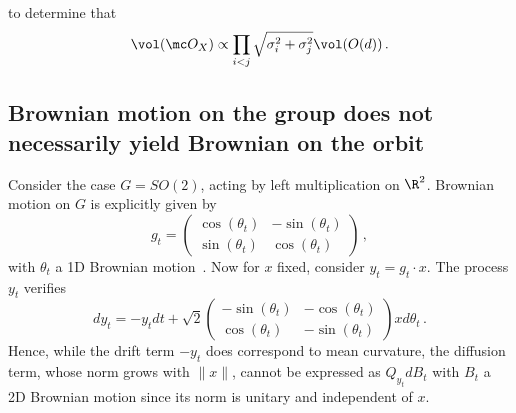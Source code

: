 \documentclass[twoside,a4paper,11pt]{article}
\renewcommand{\phi}{\varphi}
\theoremstyle{plain}
\begin{document}
to determine that 
$$
\vol(\mc O_X) 
    \propto \prod_{i<j} \sqrt{\sigma_i^2 + \sigma_j^2} \vol (O(d)) \, .
$$

\subsection{Brownian motion on the group does not necessarily yield Brownian on the orbit}
\label{subsec:BM_on_group_counterexample}

Consider the case $G = SO(2)$,
acting by left multiplication on $\R^2$. Brownian motion on $G$ is explicitly given by
$$
g_t = 
\begin{pmatrix}
\cos(\theta_t) & -\sin(\theta_t) \\
\sin(\theta_t) & \cos(\theta_t)
\end{pmatrix}
\, ,
$$
with $\theta_t$ a 1D Brownian motion~\cite[Example 3.3.1]{hsu2002stochastic}. Now for $x$ fixed, consider $y_t = g_t \cdot x$. The process $y_t$ verifies 
$$
d y_t = - y_t dt + \sqrt{2} \begin{pmatrix}
-\sin(\theta_t) & - \cos(\theta_t) \\
\cos(\theta_t) & -\sin(\theta_t)
\end{pmatrix} x d \theta_t \, .
$$
Hence, while the drift term $-y_t$ does correspond to mean curvature, the diffusion term, whose norm grows with $\|x\|$, cannot be expressed as $Q_{y_t} d B_t$ with $B_t$ a 2D Brownian motion since its norm is unitary and independent of $x$.
\end{document}
